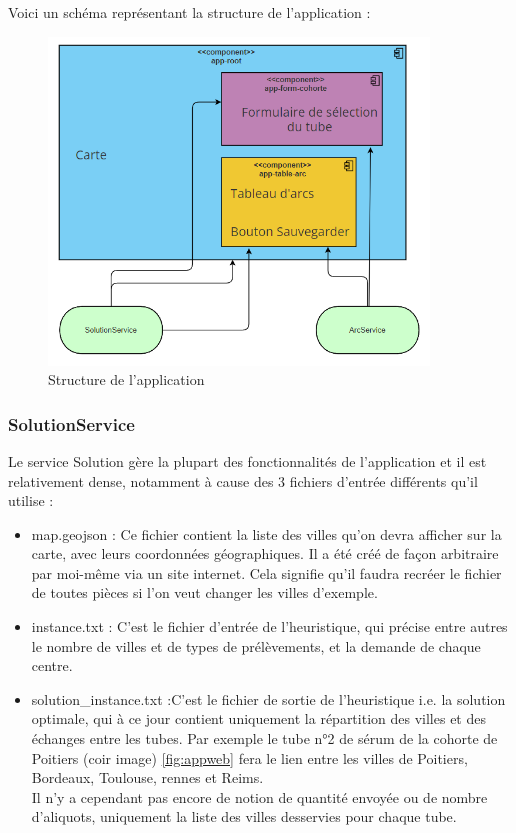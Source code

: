 \documentclass{polytech/polytech}
\numberwithin{figure}{chapter}
\begin{document}
Voici un schéma représentant la structure de l'application :

\begin{figure}[h]
    \centering
    \includegraphics[width=0.9\textwidth]{pic/structureapp.png}
    \caption{Structure de l'application}
\end{figure}

\subsubsection{SolutionService}

Le service Solution gère la plupart des fonctionnalités de l'application et il est relativement dense, notamment à cause des 3 fichiers d'entrée différents qu'il utilise :\\

\begin{itemize}
	\item map.geojson : Ce fichier contient la liste des villes qu'on devra afficher sur la carte, avec leurs coordonnées géographiques. Il a été créé de façon arbitraire par moi-même via un site internet. Cela signifie qu'il faudra recréer le fichier de toutes pièces si l'on veut changer les villes d'exemple.
	\item instance.txt : C'est le fichier d'entrée de l'heuristique, qui précise entre autres le nombre de villes et de types de prélèvements, et la demande de chaque centre.
	\item solution\_instance.txt :C'est le fichier de sortie de l'heuristique i.e. la solution optimale, qui à ce jour contient uniquement la répartition des villes et des échanges entre les tubes. Par exemple le tube n°2 de sérum de la cohorte de Poitiers (coir image) \ref{fig:appweb} fera le lien entre les villes de Poitiers, Bordeaux, Toulouse, rennes et Reims.\\
    Il n'y a cependant pas encore de notion de quantité envoyée ou de nombre d'aliquots, uniquement la liste des villes desservies pour chaque tube.\\
\end{itemize}
\end{document}
